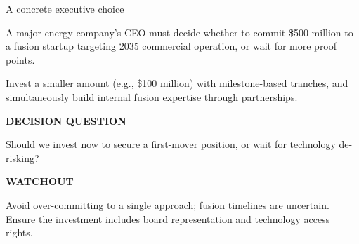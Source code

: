 \documentclass[10pt,a4paper]{article}
\begin{document}
\clearpage
{\sffamily\fontsize{21}{26}\selectfont\color{BONavy} A concrete executive choice}\par\vspace{7pt}
\begin{minipage}[t]{0.47\linewidth}
{\small A major energy company's CEO must decide whether to commit \$500 million to a fusion startup targeting 2035 commercial operation, or wait for more proof points.}\par
{\small Invest a smaller amount (e.g., \$100 million) with milestone-based tranches, and simultaneously build internal fusion expertise through partnerships.}\par
\end{minipage}\hfill\begin{minipage}[t]{0.45\linewidth}
{\textcolor{BOGreen}{\scriptsize\bfseries DECISION QUESTION}}\par\vspace{3pt}
{\sffamily\fontsize{14}{18}\selectfont\color{BOText} Should we invest now to secure a first-mover position, or wait for technology de-risking?}\par\vspace{8pt}
{\textcolor{BOGreen}{\scriptsize\bfseries WATCHOUT}}\par\vspace{3pt}
{\footnotesize\color{BOMuted} Avoid over-committing to a single approach; fusion timelines are uncertain. Ensure the investment includes board representation and technology access rights.}\par\end{minipage}
\end{document}
